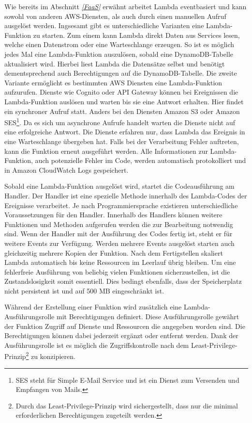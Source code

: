 {Wie bereits im Abschnitt \textit{\ref{FaaS} } erwähnt arbeitet Lambda eventbasiert und kann sowohl von anderen AWS-Diensten, als auch durch einen manuellen Aufruf ausgelöst werden.
Ingsesamt gibt es unterschiedliche Varianten eine Lambda-Funktion zu starten.
Zum einem kann Lambda direkt Daten aus Services lesen, welche einen Datenstrom oder eine Warteschlange erzeugen.
So ist es möglich jedes Mal eine Lambda-Funktion auszulösen, sobald eine DynamoDB-Tabelle aktualisiert wird.
Hierbei liest Lambda die Datensätze selbst und benötigt dementsprechend auch Berechtigungen auf die DynamoDB-Tabelle.\cite[]{LambdaDynamo}
Die zweite Variante ermöglicht es bestimmten AWS Diensten eine Lambda-Funktion aufzurufen.
Dienste wie Cognito oder API Gateway können bei Ereignissen die Lambda-Funktion auslösen und warten bis sie eine Antwort erhalten.
Hier findet ein synchroner Aufruf statt.
Anders bei den Diensten Amazon S3 oder Amazon SES\footnote{SES steht für Simple E-Mail Service und ist ein Dienst zum Versenden und Empfangen von Mails.}. Da es sich um asynchrone Aufrufe handelt warten die Dienste nicht auf eine erfolgreiche Antwort.
Die Dienste erfahren nur, dass Lambda das Ereignis in eine Warteschlange übergeben hat.
Falls bei der Verarbeitung Fehler auftreten, kann die Funktion erneut ausgeführt werden.
Alle Informationen zur Lambda-Funktion, auch potenzielle Fehler im Code, werden automatisch protokolliert und in Amazon CloudWatch Logs gespeichert.
\cite[]{LambdaDienste}

Sobald eine Lambda-Funktion ausgelöst wird, startet die Codeausführung am Handler.
Der Handler ist eine spezielle Methode innerhalb des Lambda-Codes der Ereignisse verarbeitet.
Je nach Programmiersprache existieren unterschiedliche Voraussetzungen für den Handler.
Innerhalb des Handlers können weitere Funktionen und Methoden aufgerufen werden die zur Bearbeitung notwendig sind.
Wenn der Handler mit der Ausführung des Codes fertig ist, steht er für weitere Events zur Verfügung.
Werden mehrere Events ausgelöst starten auch gleichzeitig mehrere Kopien der Funktion.
Nach dem Fertigstellen skaliert Lambda automatisch bis keine Ressourcen im Leerlauf übrig bleiben.
Um eine fehlerfreie Ausführung von beliebig vielen Funktionen sicherzustellen, ist die Zustandslosigkeit somit essentiell.
Dies bedingt ebenfalls, dass der Speicherplatz nicht persistent ist und auf 500 MB eingeschränkt ist.\cite[Seitenzahl 5-7]{AWSWhitepaper}

Während der Erstellung einer Funktion wird zusätzlich eine Lambda-Ausführungsrolle mit Berechtigungen definiert.
Diese Ausführungsrolle gewährt der Funktion Zugriff auf Dienste und Ressourcen die angegeben worden sind.
Die Berechtigungen können dabei jederzeit ergänzt oder entfernt werden.
Dank der Ausführungsrolle ist es möglich die Zugriffskontrolle nach dem Least-Privilege-Prinzip\footnote{Durch das Least-Privilege-Prinzip wird sichergestellt, dass nur die minimal erforderlichen Berechtigungen zugeteilt werden. } zu konzipieren.

}
